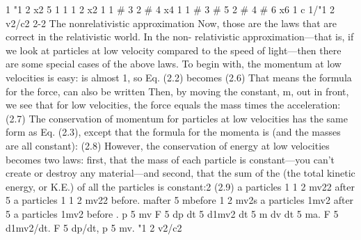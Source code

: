 \documentclass[10pt,oneside]{article}
\begin{document}
1 "1 2 x2 5 1 1 1 2 x2 1 1 \# 3 2 \# 4 x4 1 1 \# 3 \# 5 2 \# 4 \# 6 x6 1 c 1/"1 2 v2/c2 2-2 The nonrelativistic approximation Now, those are the laws that are correct in the relativistic world. In the non- relativistic approximation---that is, if we look at particles at low velocity compared to the speed of light---then there are some special cases of the above laws. To begin with, the momentum at low velocities is easy: is almost 1, so Eq. (2.2) becomes (2.6) That means the formula for the force, can also be written Then, by moving the constant, m, out in front, we see that for low velocities, the force equals the mass times the acceleration: (2.7) The conservation of momentum for particles at low velocities has the same form as Eq. (2.3), except that the formula for the momenta is (and the masses are all constant): (2.8) However, the conservation of energy at low velocities becomes two laws: first, that the mass of each particle is constant---you can’t create or destroy any material---and second, that the sum of the (the total kinetic energy, or K.E.) of all the particles is constant:2 (2.9) a particles 1 1 2 mv22 after 5 a particles 1 1 2 mv22 before. mafter 5 mbefore 1 2 mv2s a particles 1mv2 after 5 a particles 1mv2 before . p 5 mv F 5 dp dt 5 d1mv2 dt 5 m dv dt 5 ma. F 5 d1mv2/dt. F 5 dp/dt, p 5 mv. "1 2 v2/c2\par
\end{document}
